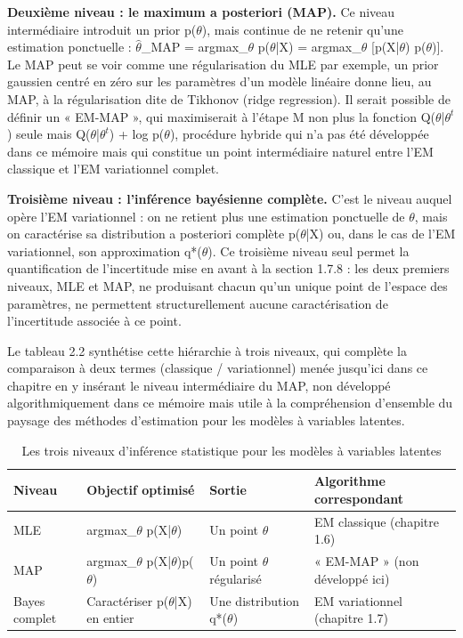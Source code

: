 \textbf{Deuxième niveau : le maximum a posteriori (MAP). }Ce niveau intermédiaire introduit un prior p($\theta $), mais continue de ne retenir qu'une estimation ponctuelle : $\hat{\theta }$\_MAP = argmax\_$\theta $ p($\theta $|X) = argmax\_$\theta $ [p(X|$\theta $) p($\theta $)]. Le MAP peut se voir comme une régularisation du MLE  par exemple, un prior gaussien centré en zéro sur les paramètres d'un modèle linéaire donne lieu, au MAP, à la régularisation dite de Tikhonov (ridge regression). Il serait possible de définir un « EM-MAP », qui maximiserait à l'étape M non plus la fonction Q($\theta $|$\theta ^{t}$) seule mais Q($\theta $|$\theta ^{t}$) + log p($\theta $), procédure hybride qui n'a pas été développée dans ce mémoire mais qui constitue un point intermédiaire naturel entre l'EM classique et l'EM variationnel complet.

\textbf{Troisième niveau : l'inférence bayésienne complète. }C'est le niveau auquel opère l'EM variationnel : on ne retient plus une estimation ponctuelle de $\theta $, mais on caractérise sa distribution a posteriori complète p($\theta $|X)  ou, dans le cas de l'EM variationnel, son approximation q*($\theta $). Ce troisième niveau seul permet la quantification de l'incertitude mise en avant à la section 1.7.8 : les deux premiers niveaux, MLE et MAP, ne produisant chacun qu'un unique point de l'espace des paramètres, ne permettent structurellement aucune caractérisation de l'incertitude associée à ce point.

Le tableau 2.2 synthétise cette hiérarchie à trois niveaux, qui complète la comparaison à deux termes (classique / variationnel) menée jusqu'ici dans ce chapitre en y insérant le niveau intermédiaire du MAP, non développé algorithmiquement dans ce mémoire mais utile à la compréhension d'ensemble du paysage des méthodes d'estimation pour les modèles à variables latentes.

\begin{table}[H]
\centering
\small
\setlength{\tabcolsep}{0.14cm}
\begin{tabular}{|p{3.54cm}|p{3.54cm}|p{3.54cm}|p{3.54cm}|}
\hline
\textbf{Niveau} & \textbf{Objectif optimisé} & \textbf{Sortie} & \textbf{Algorithme correspondant} \\
\hline
MLE & argmax\_$\theta $ p(X|$\theta $) & Un point $\hat{\theta }$ & EM classique (chapitre 1.6) \\
\hline
MAP & argmax\_$\theta $ p(X|$\theta $)p($\theta $) & Un point $\hat{\theta }$ régularisé & « EM-MAP » (non développé ici) \\
\hline
Bayes complet & Caractériser p($\theta $|X) en entier & Une distribution q*($\theta $) & EM variationnel (chapitre 1.7) \\
\hline
\end{tabular}
\caption{Les trois niveaux d'inférence statistique pour les modèles à variables latentes}
\label{tab:2_2}
\end{table}

